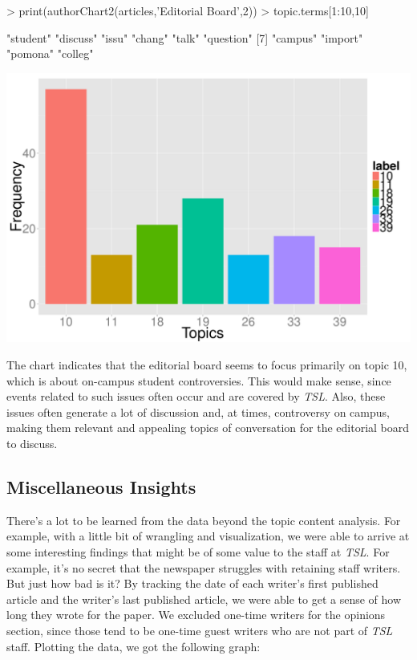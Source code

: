 \documentclass[a4paper]{article}
\begin{document}
\begin{Schunk}
\begin{Sinput}
> print(authorChart2(articles,'Editorial Board',2))
> topic.terms[1:10,10]
\end{Sinput}
\begin{Soutput}
 [1] "student"  "discuss"  "issu"     "chang"    "talk"     "question"
 [7] "campus"   "import"   "pomona"   "colleg"  
\end{Soutput}
\end{Schunk}
\includegraphics{FinalProject-012}

The chart indicates that the editorial board seems to focus primarily on topic 10, which is about on-campus student controversies. This would make sense, since events related to such issues often occur and are covered by \textit{TSL}. Also, these issues often generate a lot of discussion and, at times, controversy on campus, making them relevant and appealing topics of conversation for the editorial board to discuss.

\subsection{Miscellaneous Insights}


There's a lot to be learned from the data beyond the topic content analysis. For example, with a little bit of wrangling and visualization, we were able to arrive at some interesting findings that might be of some value to the staff at \textit{TSL}. For example, it's no secret that the newspaper struggles with retaining staff writers. But just how bad is it? By tracking the date of each writer's first published article and the writer's last published article, we were able to get a sense of how long they wrote for the paper. We excluded one-time writers for the opinions section, since those tend to be one-time guest writers who are not part of \textit{TSL} staff. Plotting the data, we got the following graph:
\end{document}
